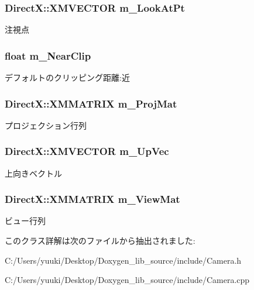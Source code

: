 \subsubsection[{\texorpdfstring{m\+\_\+\+Look\+At\+Pt}{m_LookAtPt}}]{\setlength{\rightskip}{0pt plus 5cm}Direct\+X\+::\+X\+M\+V\+E\+C\+T\+OR m\+\_\+\+Look\+At\+Pt\hspace{0.3cm}{\ttfamily [private]}}\hypertarget{class_camera_ab9dac33a4cb297f8ecdd55444df9a926}{}\label{class_camera_ab9dac33a4cb297f8ecdd55444df9a926}
注視点 
\subsubsection[{\texorpdfstring{m\+\_\+\+Near\+Clip}{m_NearClip}}]{\setlength{\rightskip}{0pt plus 5cm}float m\+\_\+\+Near\+Clip\hspace{0.3cm}{\ttfamily [private]}}\hypertarget{class_camera_a4bea0bad40f6b75b9c5eb19801a684a7}{}\label{class_camera_a4bea0bad40f6b75b9c5eb19801a684a7}
デフォルトのクリッピング距離\+:近 
\subsubsection[{\texorpdfstring{m\+\_\+\+Proj\+Mat}{m_ProjMat}}]{\setlength{\rightskip}{0pt plus 5cm}Direct\+X\+::\+X\+M\+M\+A\+T\+R\+IX m\+\_\+\+Proj\+Mat\hspace{0.3cm}{\ttfamily [private]}}\hypertarget{class_camera_afb229fa24074664a441b129fef4cce87}{}\label{class_camera_afb229fa24074664a441b129fef4cce87}
プロジェクション行列 
\subsubsection[{\texorpdfstring{m\+\_\+\+Up\+Vec}{m_UpVec}}]{\setlength{\rightskip}{0pt plus 5cm}Direct\+X\+::\+X\+M\+V\+E\+C\+T\+OR m\+\_\+\+Up\+Vec\hspace{0.3cm}{\ttfamily [private]}}\hypertarget{class_camera_ac1e1df300cece76a2d49ee2a1d678301}{}\label{class_camera_ac1e1df300cece76a2d49ee2a1d678301}
上向きベクトル 
\subsubsection[{\texorpdfstring{m\+\_\+\+View\+Mat}{m_ViewMat}}]{\setlength{\rightskip}{0pt plus 5cm}Direct\+X\+::\+X\+M\+M\+A\+T\+R\+IX m\+\_\+\+View\+Mat\hspace{0.3cm}{\ttfamily [private]}}\hypertarget{class_camera_a06ae0945a26221c132c14896d09d1a3b}{}\label{class_camera_a06ae0945a26221c132c14896d09d1a3b}
ビュー行列 

このクラス詳解は次のファイルから抽出されました\+:\begin{DoxyCompactItemize}
\item 
C\+:/\+Users/yuuki/\+Desktop/\+Doxygen\+\_\+lib\+\_\+source/include/Camera.\+h\item 
C\+:/\+Users/yuuki/\+Desktop/\+Doxygen\+\_\+lib\+\_\+source/include/Camera.\+cpp\end{DoxyCompactItemize}
